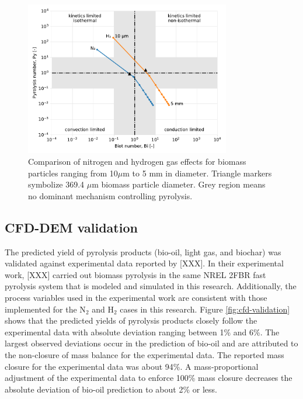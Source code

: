 \begin{figure}[H]
    \centering
    \includegraphics[width=0.8\textwidth]{figures/biot-pyro-diams.pdf}
    \caption{Comparison of nitrogen and hydrogen gas effects for biomass particles ranging from 10$\mu$m to 5 mm in diameter. Triangle markers symbolize 369.4 $\mu$m biomass particle diameter. Grey region means no dominant mechanism controlling pyrolysis.}
    \label{fig:biot-pyro-diams}
\end{figure}


\subsection{CFD-DEM validation}

The predicted yield of pyrolysis products (bio-oil, light gas, and biochar) was validated against experimental data reported by [XXX]. In their experimental work, [XXX] carried out biomass pyrolysis in the same NREL 2FBR fast pyrolysis system that is modeled and simulated in this research. Additionally, the process variables used in the experimental work are consistent with those implemented for the N$_2$ and H$_2$ cases in this research. Figure \ref{fig:cfd-validation} shows that the predicted yields of pyrolysis products closely follow the experimental data with absolute deviation ranging between 1\% and 6\%. The largest observed deviations occur in the prediction of bio-oil and are attributed to the non-closure of mass balance for the experimental data. The reported mass closure for the experimental data was about 94\%. A mass-proportional adjustment of the experimental data to enforce 100\% mass closure decreases the absolute deviation of bio-oil prediction to about 2\% or less.

